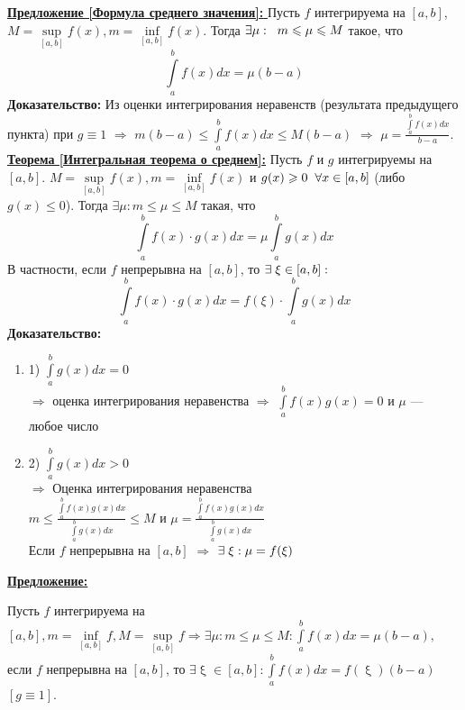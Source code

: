 \documentclass[a4paper,12pt]{article} %
\renewcommand {\geq}{\geqslant}
\renewcommand {\leq}{\leqslant}
\begin{document}
	\underline{\textbf{Предложение [Формула среднего значения]: }}
	Пусть $ f $ интегрируема на $ [a, b] $, $ M = \sup\limits_{[a, b]} f(x), m = \inf\limits_{[a, b]} f(x) $. Тогда $ \exists \mu: \hspace{2 mm} m \leq \mu \leq M $ такое, что
	$$ \int\limits_a^b f(x)dx = \mu (b - a)$$
	\textbf{Доказательство:}
	Из оценки интегрирования неравенств (результата предыдущего пункта) при $ g \equiv 1 $ $\Rightarrow$ $ m (b - a) \leq \int\limits_a^b f (x)dx \leq M(b - a) $ $ \Rightarrow $ $\displaystyle \mu = \frac {\int\limits_a^b f(x)dx}{b -a }$.\\
	\underline{\textbf{Теорема [Интегральная теорема о среднем]:}}
	Пусть $ f $ и $ g $ интегрируемы на $ [a, b] $. $ M = \sup\limits_{[a,b]} f(x), m = \inf\limits_{[a,b]} f(x) $ и $ g(x) \geq 0 \hspace{2mm} \forall x \in [a, b] $ (либо  $g (x) \leq 0 $). Тогда $\exists \mu: m \leq \mu \leq M $ такая, что
	$$ \int\limits_a^b f(x) \cdot g(x)dx = \mu \int\limits_a^b g(x)dx$$
	В частности, если $ f $ непрерывна на $ [a, b] $, то $\exists \hspace{1 mm} \xi \in [a,b]: $ \\ 
	$$ \int\limits_a^b f(x) \cdot g(x)dx = f(\xi) \cdot \int\limits_a^b g(x)dx$$
	\textbf{Доказательство:}
	\begin{enumerate}
		\item 1) $\int\limits_a^b g(x)dx = 0 $ \\
		$\Rightarrow$ оценка интегрирования неравенства $\Rightarrow$ $\int\limits_a^b f(x)g(x) = 0 $ и $\mu $ --- любое число\\  
		
		\item 2) $\int\limits_a^b g(x)dx > 0 $ \\
		$\Rightarrow$ Оценка интегрирования неравенства \\ [2mm]
		$\displaystyle m \leq \frac{\int\limits_a^b f(x)g(x)dx}{\int\limits_a^b g(x)dx} \leq M$ и $\displaystyle \mu = \frac{\int\limits_a^b f(x)g(x)dx}{\int\limits_a^b g(x)dx} $ \\
		Если $ f $ непрерывна на $ [a,b] $ $\Rightarrow$ $\exists \hspace{1 mm} \xi: \mu = f(\xi) $
	\end{enumerate}
	
	\underline{\textbf{Предложение:}}
	
	Пусть $f$ интегрируема на $[a,b], m = \inf\limits_{[a,b]}f, M = \sup \limits_{[a,b]}f \Rightarrow \exists \mu : m\leq \mu \leq M: \int \limits_a^b f(x)dx = \mu(b-a),$ если $f$ непрерывна на $[a,b]$, то $\exists \upxi \in [a,b]: \int \limits_a^b f(x)dx = f(\upxi)(b-a)$  $[g\equiv 1]$.
\end{document}
